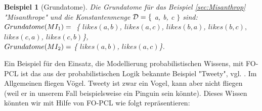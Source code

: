 \documentclass[draft]{scrreprt}
\newtheorem{Bsp}{Beispiel}[section]
\begin{document}
\begin{Bsp}[Grundatome]
Die Grundatome für das Beispiel \ref{sec:Misanthrop} "{}Misanthrope"{} und die Konstantenmenge $ \cal{D} = \{$ a, b, c $\} $  sind:\\
$ Grundatome(MI_{1}) = \\ $  \{ $likes(a, b) $, $likes(a, c) $, $likes(b, a) $, $likes(b, c),  $ $likes(c, a)$, $likes(c, b) $\}, \\$Grundatome(MI_{2}) =\\ $\{ $likes(a, b)  $, $likes(a, c)  $\}. \\
	
	
\end{Bsp}
\newpage

Ein Beispiel für den Einsatz, die Modellierung probabilistischen Wissens, mit FO-PCL ist das aus der probabilistischen Logik bekannte Beispiel "{}Tweety"{}, vgl. \cite[Bsp. 8.30, S. 261]{BKI08}. Im Allgemeinen fliegen Vögel. Tweety ist zwar ein Vogel, kann aber nicht fliegen (weil er in unserem Fall beispielsweise ein Pinguin sein könnte). Dieses Wissen könnten wir mit Hilfe von FO-PCL wie folgt repräsentieren:
\end{document}
